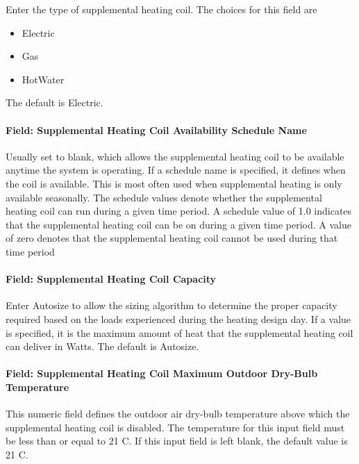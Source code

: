 Enter the type of supplemental heating coil. The choices for this field are

\begin{itemize}
\item
  Electric
\item
  Gas
\item
  HotWater
\end{itemize}

The default is Electric.

\paragraph{Field: Supplemental Heating Coil Availability Schedule Name}\label{field-supplemental-heating-coil-availability-schedule-name-2}

Usually set to blank, which allows the supplemental heating coil to be available anytime the system is operating. If a schedule name is specified, it defines when the coil is available. This is most often used when supplemental heating is only available seasonally. The schedule values denote whether the supplemental heating coil can run during a given time period. A schedule value of 1.0 indicates that the supplemental heating coil can be on during a given time period. A value of zero denotes that the supplemental heating coil cannot be used during that time period

\paragraph{Field: Supplemental Heating Coil Capacity}\label{field-supplemental-heating-coil-capacity-2}

Enter Autosize to allow the sizing algorithm to determine the proper capacity required based on the loads experienced during the heating design day. If a value is specified, it is the maximum amount of heat that the supplemental heating coil can deliver in Watts. The default is Autosize.

\paragraph{Field: Supplemental Heating Coil Maximum Outdoor Dry-Bulb Temperature}\label{field-supplemental-heating-coil-maximum-outdoor-dry-bulb-temperature-1}

This numeric field defines the outdoor air dry-bulb temperature above which the supplemental heating coil is disabled. The temperature for this input field must be less than or equal to 21 C. If this input field is left blank, the default value is 21 C.

